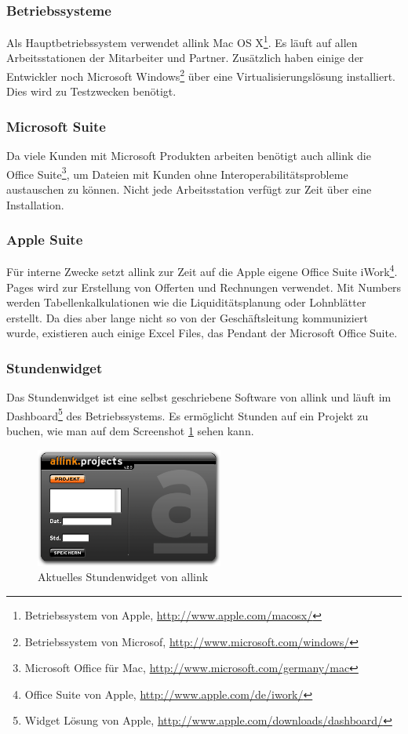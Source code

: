 \subsubsection{Betriebssysteme}
Als Hauptbetriebssystem verwendet allink Mac OS X\footnote{Betriebssystem von Apple, \url{http://www.apple.com/macosx/}}.
Es läuft auf allen Arbeitsstationen der Mitarbeiter und Partner. Zusätzlich haben einige der
Entwickler noch Microsoft Windows\footnote{Betriebssystem von Microsof, \url{http://www.microsoft.com/windows/}}
über eine Virtualisierungslösung installiert. Dies wird zu Testzwecken benötigt.

\subsubsection{Microsoft Suite}
Da viele Kunden mit Microsoft Produkten arbeiten benötigt auch allink die
Office Suite\footnote{Microsoft Office für Mac, \url{http://www.microsoft.com/germany/mac}}, 
um Dateien mit Kunden ohne Interoperabilitätsprobleme
austauschen zu können. Nicht jede Arbeitsstation verfügt zur Zeit über eine
Installation.

\subsubsection{Apple Suite}
Für interne Zwecke setzt allink zur Zeit auf die Apple eigene Office Suite
iWork\footnote{Office Suite von Apple, \url{http://www.apple.com/de/iwork/}}.
Pages wird zur Erstellung von Offerten und Rechnungen verwendet. Mit Numbers
werden Tabellenkalkulationen wie die Liquiditätsplanung oder Lohnblätter erstellt.
Da dies aber lange nicht so von der Geschäftsleitung kommuniziert wurde, existieren
auch einige Excel Files, das Pendant der Microsoft Office Suite.

\subsubsection{Stundenwidget}
Das Stundenwidget ist eine selbst geschriebene Software von allink und läuft
im Dashboard\footnote{Widget Lösung von Apple, \url{http://www.apple.com/downloads/dashboard/}} des Betriebssystems.
Es ermöglicht Stunden auf ein Projekt zu buchen, wie man auf dem Screenshot \ref{pic:ist_widget}
sehen kann.

\begin{figure}[htbp]
\begin{center}
\includegraphics[width=0.55\textwidth,angle=0]{./bilder/ist_widget.png}
\caption{Aktuelles Stundenwidget von allink}
\label{pic:ist_widget}
\end{center}
\end{figure}

